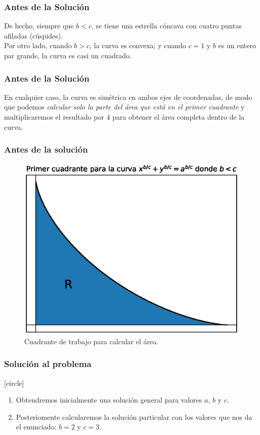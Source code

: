 \begin{frame}
\frametitle{Antes de la Solución}
De hecho, siempre que $b < c$, se tiene una estrella cóncava con cuatro puntas afiladas (cúspides).
\\
\bigskip
Por otro lado, cuando $b > c$, la curva es convexa; y cuando $c = 1$ y $b$ es un entero par grande, la curva es casi un cuadrado.
\end{frame}
\begin{frame}
\frametitle{Antes de la Solución}
En cualquier caso, la curva es simétrica en ambos ejes de coordenadas, de modo que podemos \emph{calcular solo la parte del área que está en el primer cuadrante} y multiplicaremos el resultado por $4$ para obtener el área completa dentro de la curva.
\end{frame}
\begin{frame}
\frametitle{Antes de la solución}
\begin{figure}[H]
    \centering
    \includegraphics[scale=0.5]{Imagenes/plot_curva_estrella_02.eps}
    \caption{Cuadrante de trabajo para calcular el área.}
    \label{fig:figura_curva_estrella_cuadrante}
\end{figure}
\end{frame}
\begin{frame}
\frametitle{Solución al problema}
[circle]
\begin{enumerate}[<+->]
\item Obtendremos inicialmente una solución general para valores $a$, $b$ y $c$.
\item Posteriomente calcularemos la solución particular con los valores que nos da el enunciado: $b = 2$ y $c = 3$.
\end{enumerate}
\end{frame}
